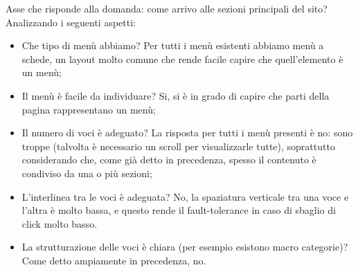 Asse che risponde alla domanda: come arrivo alle sezioni principali del sito? \\
Analizzando i seguenti aspetti:
	\begin{itemize}
		\item Che tipo di menù abbiamo? Per tutti i menù esistenti abbiamo menù a schede, un layout molto comune che rende facile capire che quell'elemento è un menù;
		\item Il menù è facile da individuare? Si, si è in grado di capire che parti della pagina rappresentano un menù;
		\item Il numero di voci è adeguato? La risposta per tutti i menù presenti è no: sono troppe (talvolta è necessario un scroll per visualizzarle tutte), soprattutto considerando che, come già detto in precedenza, spesso il contenuto è condiviso da una o più sezioni;
		\item L'interlinea tra le voci è adeguata? No, la spaziatura verticale tra una voce e l'altra è molto bassa, e questo rende il fault-tolerance in caso di sbaglio di click molto basso.
		\item La strutturazione delle voci è chiara (per esempio esistono macro categorie)? Come detto ampiamente in precedenza, no.
	\end{itemize}